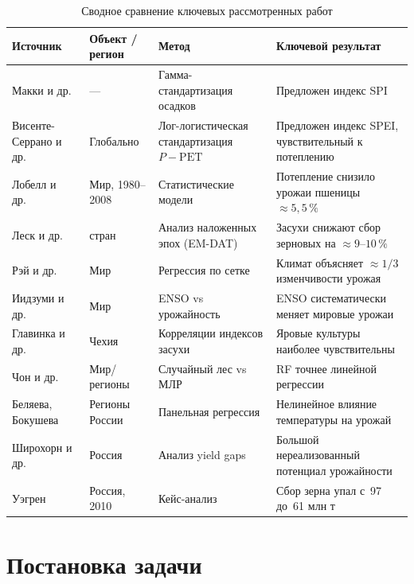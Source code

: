 \documentclass[14pt,a4paper]{extarticle}
\begin{document}
\begin{table}[H]
\caption{Сводное сравнение ключевых рассмотренных работ}
\label{tab:lit}
\footnotesize
\begin{tabularx}{\textwidth}{>{\raggedright\arraybackslash}p{3.0cm} >{\raggedright\arraybackslash}p{2.6cm} >{\raggedright\arraybackslash}p{3.0cm} >{\raggedright\arraybackslash}X}
\toprule
Источник & Объект / регион & Метод & Ключевой результат \\
\midrule
Макки и др.~\cite{mckee1993} & --- & Гамма-стандартизация осадков & Предложен индекс SPI \\
Висенте-Серрано и др.~\cite{vicenteserrano2010} & Глобально & Лог-логистическая стандартизация $P-\text{PET}$ & Предложен индекс SPEI, чувствительный к потеплению \\
Лобелл и др.~\cite{lobell2011} & Мир, 1980--2008 & Статистические модели & Потепление снизило урожаи пшеницы $\approx 5{,}5\,\%$ \\
Леск и др.~\cite{lesk2016} & 177 стран & Анализ наложенных эпох (EM-DAT) & Засухи снижают сбор зерновых на $\approx 9$--$10\,\%$ \\
Рэй и др.~\cite{ray2015} & Мир & Регрессия по сетке & Климат объясняет $\approx 1/3$ изменчивости урожая \\
Иидзуми и др.~\cite{iizumi2014} & Мир & ENSO vs урожайность & ENSO систематически меняет мировые урожаи \\
Главинка и др.~\cite{hlavinka2009} & Чехия & Корреляции индексов засухи & Яровые культуры наиболее чувствительны \\
Чон и др.~\cite{jeong2016} & Мир/регионы & Случайный лес vs МЛР & RF точнее линейной регрессии \\
Беляева, Бокушева~\cite{belyaeva2018} & Регионы России & Панельная регрессия & Нелинейное влияние температуры на урожай \\
Широхорн и др.~\cite{schierhorn2014} & Россия & Анализ yield gaps & Большой нереализованный потенциал урожайности \\
Уэгрен~\cite{wegren2011} & Россия, 2010 & Кейс-анализ & Сбор зерна упал с~97 до~61 млн т \\
\bottomrule
\end{tabularx}
\end{table}

\section{Постановка задачи}
\end{document}
